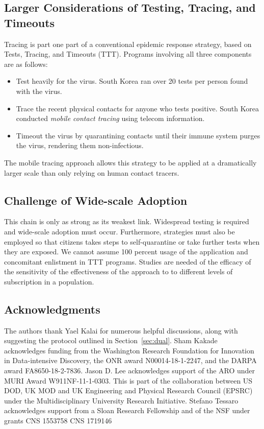 \documentclass{article}
\begin{document}

\subsection{Larger Considerations of Testing, Tracing, and Timeouts}
Tracing is part one part of a conventional epidemic response strategy, based on Tests, Tracing, and Timeouts (TTT). Programs involving all three components are as follows:
\begin{itemize}
\item Test heavily for the virus.  South Korea ran over 20 tests per person found with the virus. 
\item Trace the recent physical contacts for anyone who tests positive.  South Korea conducted \emph{mobile contact tracing} using telecom information.
\item Timeout the virus by quarantining contacts until their immune system purges the virus, rendering them non-infectious.
\end{itemize}
The mobile tracing approach allows this strategy to be applied at a dramatically larger scale than only relying on human contact tracers.  

\subsection{Challenge of Wide-scale Adoption}
This chain is only as strong as its weakest link.  Widespread testing is required and wide-scale adoption must occur. Furthermore, strategies must also be employed so that citizens takes steps to self-quarantine or take further tests when they are exposed. We cannot assume 100 percent usage of the application and concomitant enlistment in TTT programs.  Studies are needed of the efficacy of the sensitivity of the effectiveness of the approach to to different levels of subscription in a population.

\subsection*{Acknowledgments}
The authors thank Yael Kalai for numerous helpful discussions, along with suggesting the protocol outlined in Section~\ref{sec:dual}.
Sham Kakade acknowledges funding from the Washington Research
Foundation for Innovation in Data-intensive Discovery, the ONR award
N00014-18-1-2247, and the DARPA award
FA8650-18-2-7836. Jason D. Lee acknowledges support of the ARO under MURI Award W911NF-11-1-0303.  This is part of the collaboration between US DOD, UK MOD and UK Engineering and Physical Research Council (EPSRC) under the Multidisciplinary University Research Initiative. Stefano Tessaro acknowledges support from a Sloan Research Fellowship and of the NSF under grants CNS 1553758 CNS 1719146 
\end{document}
